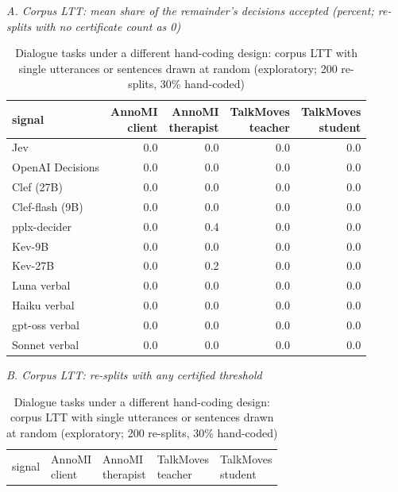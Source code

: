 \begin{table}[t]
\centering
\small
\caption{Dialogue tasks under a different hand-coding design: corpus LTT with single utterances or sentences drawn at random (exploratory; 200 re-splits, 30\% hand-coded)}
\label{tab:tab21b_utterance_sampling}
\par\textit{A. Corpus LTT: mean share of the remainder's decisions accepted (percent; re-splits with no certificate count as 0)}\par\smallskip
\begin{adjustbox}{max width=\linewidth}
\begin{tabular}{lrrrr}
\toprule
signal & \makecell[br]{AnnoMI \\{} client} & \makecell[br]{AnnoMI \\{} therapist} & \makecell[br]{TalkMoves \\{} teacher} & \makecell[br]{TalkMoves \\{} student} \\
\midrule
Jev & 0.0 & 0.0 & 0.0 & 0.0 \\
OpenAI Decisions & 0.0 & 0.0 & 0.0 & 0.0 \\
Clef (27B) & 0.0 & 0.0 & 0.0 & 0.0 \\
Clef-flash (9B) & 0.0 & 0.0 & 0.0 & 0.0 \\
pplx-decider & 0.0 & 0.4 & 0.0 & 0.0 \\
Kev-9B & 0.0 & 0.0 & 0.0 & 0.0 \\
Kev-27B & 0.0 & 0.2 & 0.0 & 0.0 \\
Luna verbal & 0.0 & 0.0 & 0.0 & 0.0 \\
Haiku verbal & 0.0 & 0.0 & 0.0 & 0.0 \\
gpt-oss verbal & 0.0 & 0.0 & 0.0 & 0.0 \\
Sonnet verbal & 0.0 & 0.0 & 0.0 & 0.0 \\
\bottomrule
\end{tabular}
\end{adjustbox}
\medskip
\par\textit{B. Corpus LTT: re-splits with any certified threshold}\par\smallskip
\begin{adjustbox}{max width=\linewidth}
\begin{tabular}{lllll}
\toprule
signal & \makecell[bl]{AnnoMI \\{} client} & \makecell[bl]{AnnoMI \\{} therapist} & \makecell[bl]{TalkMoves \\{} teacher} & \makecell[bl]{TalkMoves \\{} student} \\

\end{tabular}
\end{adjustbox}
\end{table}
